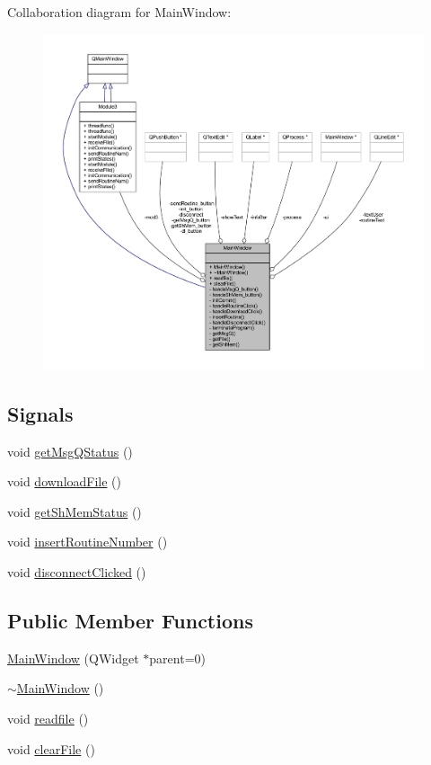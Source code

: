 Collaboration diagram for Main\+Window\+:
\nopagebreak
\begin{figure}[H]
\begin{center}
\leavevmode
\includegraphics[width=350pt]{class_main_window__coll__graph}
\end{center}
\end{figure}
\subsection*{Signals}
\begin{DoxyCompactItemize}
\item 
void \mbox{\hyperlink{class_main_window_a0b1a3960102da5863d7d31570d2837b7}{get\+Msg\+Q\+Status}} ()
\item 
void \mbox{\hyperlink{class_main_window_af8f815f498b3ecec7c8e19dfbc8b6c47}{download\+File}} ()
\item 
void \mbox{\hyperlink{class_main_window_a491881163b44282206d1313243af5e2f}{get\+Sh\+Mem\+Status}} ()
\item 
void \mbox{\hyperlink{class_main_window_aadedb5af94649f8e8a16c6642aa7b319}{insert\+Routine\+Number}} ()
\item 
void \mbox{\hyperlink{class_main_window_a18ba5e9b20b321fec60894796e053ca5}{disconnect\+Clicked}} ()
\end{DoxyCompactItemize}
\subsection*{Public Member Functions}
\begin{DoxyCompactItemize}
\item 
\mbox{\hyperlink{class_main_window_a8b244be8b7b7db1b08de2a2acb9409db}{Main\+Window}} (Q\+Widget $\ast$parent=0)
\item 
\mbox{\hyperlink{class_main_window_ae98d00a93bc118200eeef9f9bba1dba7}{$\sim$\+Main\+Window}} ()
\item 
void \mbox{\hyperlink{class_main_window_a45eac78192a605f450c10b8c4b1bde81}{readfile}} ()
\item 
void \mbox{\hyperlink{class_main_window_abc60bc84ec0badc555d692af286f8053}{clear\+File}} ()
\end{DoxyCompactItemize}
